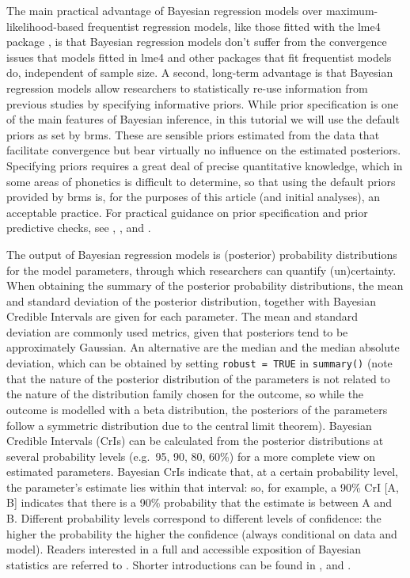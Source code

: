 \documentclass[
  authoryear,
  preprint,
  3p]{elsarticle}
\begin{document}
The main practical advantage of Bayesian regression models over
maximum-likelihood-based frequentist regression models, like those
fitted with the lme4 package \citep{bates2015}, is that Bayesian
regression models don't suffer from the convergence issues that models
fitted in lme4 \citep{bates2015} and other packages
\citep{cribarineto2010} that fit frequentist models do, independent of
sample size. A second, long-term advantage is that Bayesian regression
models allow researchers to statistically re-use information from
previous studies by specifying informative priors. While prior
specification is one of the main features of Bayesian inference, in this
tutorial we will use the default priors as set by brms. These are
sensible priors estimated from the data that facilitate convergence but
bear virtually no influence on the estimated posteriors. Specifying
priors requires a great deal of precise quantitative knowledge, which in
some areas of phonetics is difficult to determine, so that using the
default priors provided by brms is, for the purposes of this article
(and initial analyses), an acceptable practice. For practical guidance
on prior specification and prior predictive checks, see
\citet{bockting2024}, \citet{mikkola2024},
\citet{standevelopmentteam2025} and \citet[p.~82-84]{mcelreath2020}.

The output of Bayesian regression models is (posterior) probability
distributions for the model parameters, through which researchers can
quantify (un)certainty. When obtaining the summary of the posterior
probability distributions, the mean and standard deviation of the
posterior distribution, together with Bayesian Credible Intervals are
given for each parameter. The mean and standard deviation are commonly
used metrics, given that posteriors tend to be approximately Gaussian.
An alternative are the median and the median absolute deviation, which
can be obtained by setting \texttt{robust\ =\ TRUE} in
\texttt{summary()} (note that the nature of the posterior distribution
of the parameters is not related to the nature of the distribution
family chosen for the outcome, so while the outcome is modelled with a
beta distribution, the posteriors of the parameters follow a symmetric
distribution due to the central limit theorem). Bayesian Credible
Intervals (CrIs) can be calculated from the posterior distributions at
several probability levels (e.g.~95, 90, 80, 60\%) for a more complete
view on estimated parameters. Bayesian CrIs indicate that, at a certain
probability level, the parameter's estimate lies within that interval:
so, for example, a 90\% CrI {[}A, B{]} indicates that there is a 90\%
probability that the estimate is between A and B. Different probability
levels correspond to different levels of confidence: the higher the
probability the higher the confidence (always conditional on data and
model). Readers interested in a full and accessible exposition of
Bayesian statistics are referred to \citet{mcelreath2019}. Shorter
introductions can be found in \citet{etz2018}, \citet{vasishth2018} and
\citet{nalborczyk2019}.
\end{document}
